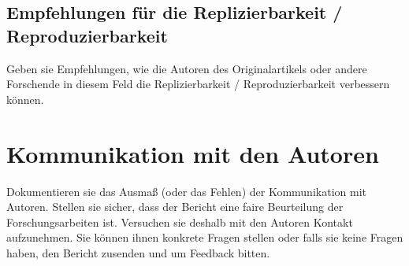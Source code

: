 \documentclass[DIV=13,fontsize=11pt]{scrartcl}
\begin{document}
\subsection{Empfehlungen für die Replizierbarkeit / Reproduzierbarkeit}
Geben sie Empfehlungen, wie die Autoren des Originalartikels oder andere Forschende in diesem Feld die Replizierbarkeit / Reproduzierbarkeit verbessern können.


\section{Kommunikation mit den Autoren}
Dokumentieren sie das Ausmaß (oder das Fehlen) der Kommunikation mit Autoren.
Stellen sie sicher, dass der Bericht eine faire Beurteilung der Forschungsarbeiten ist. Versuchen sie deshalb mit den Autoren Kontakt aufzunehmen.
Sie können ihnen konkrete Fragen stellen oder falls sie keine Fragen haben, den Bericht zusenden und um Feedback bitten.




\end{document}
